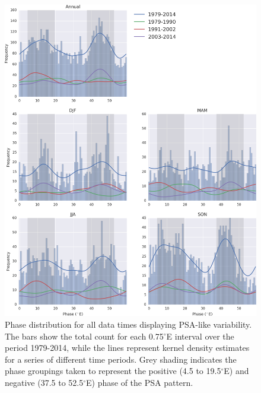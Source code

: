 \begin{figure}
\begin{center}
\includegraphics[width=0.98\columnwidth]{figures/psa/psa-phase-histogram_wave6_ERAInterim_500hPa-lat10S10Nmean-lon115E235Ezeropad_030day-runmean-anom-wrt-all_native-np20N260E.png}
\caption{\label{fig:phase_distribution}
Phase distribution for all data times displaying PSA-like variability. The bars show the total count for each 0.75$^{\circ}$E interval over the period 1979-2014, while the lines represent kernel density estimates for a series of different time periods. Grey shading indicates the phase groupings taken to represent the positive (4.5 to 19.5$^{\circ}$E) and negative (37.5 to 52.5$^{\circ}$E) phase of the PSA pattern.%
}
\end{center}
\end{figure}

